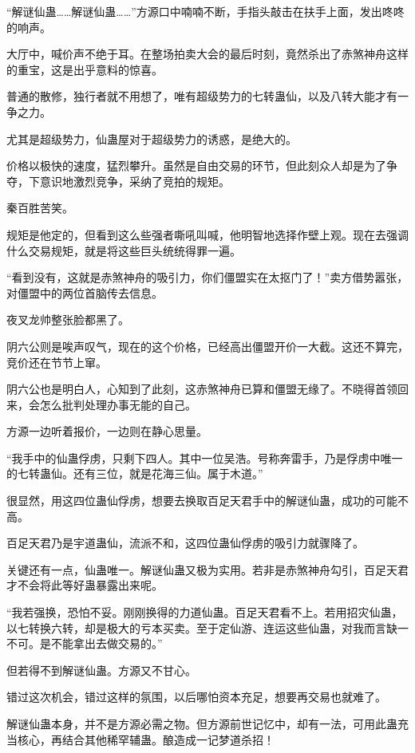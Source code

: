 
\begin{this_body}

“解谜仙蛊……解谜仙蛊……”方源口中喃喃不断，手指头敲击在扶手上面，发出咚咚的响声。

大厅中，喊价声不绝于耳。在整场拍卖大会的最后时刻，竟然杀出了赤煞神舟这样的重宝，这是出乎意料的惊喜。

普通的散修，独行者就不用想了，唯有超级势力的七转蛊仙，以及八转大能才有一争之力。

尤其是超级势力，仙蛊屋对于超级势力的诱惑，是绝大的。

价格以极快的速度，猛烈攀升。虽然是自由交易的环节，但此刻众人却是为了争夺，下意识地激烈竞争，采纳了竞拍的规矩。

秦百胜苦笑。

规矩是他定的，但看到这么些强者嘶吼叫喊，他明智地选择作壁上观。现在去强调什么交易规矩，就是将这些巨头统统得罪一遍。

“看到没有，这就是赤煞神舟的吸引力，你们僵盟实在太抠门了！”卖方借势嚣张，对僵盟中的两位首脑传去信息。

夜叉龙帅整张脸都黑了。

阴六公则是唉声叹气，现在的这个价格，已经高出僵盟开价一大截。这还不算完，竞价还在节节上窜。

阴六公也是明白人，心知到了此刻，这赤煞神舟已算和僵盟无缘了。不晓得首领回来，会怎么批判处理办事无能的自己。

方源一边听着报价，一边则在静心思量。

“我手中的仙蛊俘虏，只剩下四人。其中一位吴浩。号称奔雷手，乃是俘虏中唯一的七转蛊仙。还有三位，就是花海三仙。属于木道。”

很显然，用这四位蛊仙俘虏，想要去换取百足天君手中的解谜仙蛊，成功的可能不高。

百足天君乃是宇道蛊仙，流派不和，这四位蛊仙俘虏的吸引力就骤降了。

关键还有一点，仙蛊唯一。解谜仙蛊又极为实用。若非是赤煞神舟勾引，百足天君才不会将此等好蛊暴露出来呢。

“我若强换，恐怕不妥。刚刚换得的力道仙蛊。百足天君看不上。若用招灾仙蛊，以七转换六转，却是极大的亏本买卖。至于定仙游、连运这些仙蛊，对我而言缺一不可。是不能拿出去做交易的。”

但若得不到解谜仙蛊。方源又不甘心。

错过这次机会，错过这样的氛围，以后哪怕资本充足，想要再交易也就难了。

解谜仙蛊本身，并不是方源必需之物。但方源前世记忆中，却有一法，可用此蛊充当核心，再结合其他稀罕辅蛊。酿造成一记梦道杀招！


\end{this_body}
